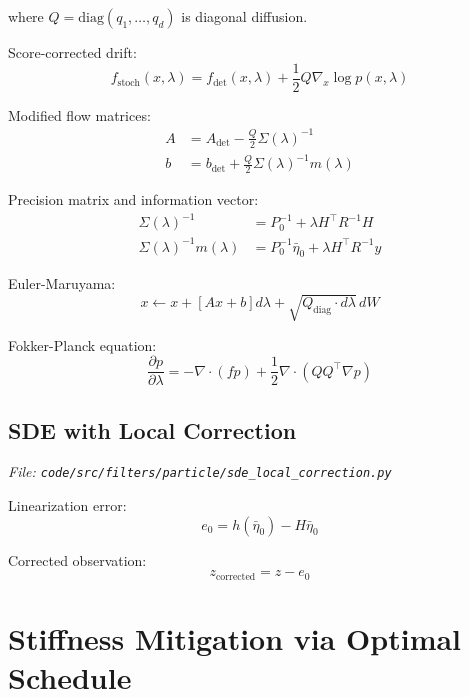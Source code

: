 \documentclass[12pt]{article}
\begin{document}
where $Q = \text{diag}(q_1, \ldots, q_d)$ is diagonal diffusion.

Score-corrected drift:
\begin{equation}
f_{\text{stoch}}(x, \lambda) = f_{\text{det}}(x, \lambda) + \frac{1}{2} Q \nabla_x \log p(x, \lambda)
\end{equation}

Modified flow matrices:
\begin{align}
A &= A_{\text{det}} - \frac{Q}{2} \Sigma(\lambda)^{-1} \\
b &= b_{\text{det}} + \frac{Q}{2} \Sigma(\lambda)^{-1} m(\lambda)
\end{align}

Precision matrix and information vector:
\begin{align}
\Sigma(\lambda)^{-1} &= P_0^{-1} + \lambda H^\top R^{-1} H \\
\Sigma(\lambda)^{-1} m(\lambda) &= P_0^{-1} \bar{\eta}_0 + \lambda H^\top R^{-1} y
\end{align}

Euler-Maruyama:
\begin{equation}
x \leftarrow x + [Ax + b] d\lambda + \sqrt{Q_{\text{diag}} \cdot d\lambda} \, dW
\end{equation}

Fokker-Planck equation:
\begin{equation}
\frac{\partial p}{\partial \lambda} = -\nabla \cdot (f p) + \frac{1}{2} \nabla \cdot (Q Q^\top \nabla p)
\end{equation}

\subsection{SDE with Local Correction}
\textit{File: \texttt{code/src/filters/particle/sde\_local\_correction.py}}

Linearization error:
\begin{equation}
e_0 = h(\bar{\eta}_0) - H \bar{\eta}_0
\end{equation}

Corrected observation:
\begin{equation}
z_{\text{corrected}} = z - e_0
\end{equation}

\section{Stiffness Mitigation via Optimal Schedule}
\end{document}
